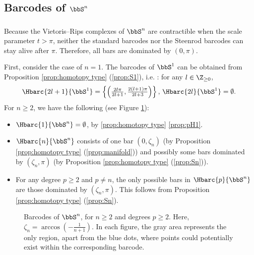 \subsection{Barcodes of $\bbS^n$}\label{ss:Sn}

\subsubsection{}

Because the Vietoris--Rips complexes of $\bbS^n$ are contractible when the scale parameter $t>\pi$, neither the standard barcodes nor the Steenrod barcodes can stay alive after $\pi$.
Therefore, all bars are dominated by $(0,\pi)$.

First, consider the case of $n=1$.
The barcodes of $\bbS^1$ can be obtained from Proposition \ref{prop:homotopy type} (\ref{prop:S1}), i.e. \cite[Theorem 7.4]{adamaszek2017vietoris}: for any $l\in \Z_{\geq 0}$,
\begin{equation}\label{eq:barc of S1}
	\Hbarc{2l+1}{\bbS^1}=\left\{\left(\tfrac{2l\pi}{2l+1},\tfrac{2(l+1)\pi}{2l+3}\right)\right\},\, \Hbarc{2l}{\bbS^1}=\emptyset.
\end{equation}
For $n\geq 2$, we have the following (see Figure \ref{fig:Sk}):
\begin{itemize}
	\item $\Hbarc{1}{\bbS^n} = \emptyset$, by \cref{prop:homotopy type} \cref{prop:pH1}.
	\item $\Hbarc{n}{\bbS^n}$ consists of one bar $(0,\zeta_n)$ (by Proposition \ref{prop:homotopy type} (\ref{prop:manifold})) and possibly some bars dominated by $(\zeta_n,\pi)$ (by Proposition \ref{prop:homotopy type} (\ref{prop:Sn})).
	\item For any degree $p\geq 2$ and $p\neq n$, the only possible bars in $\Hbarc{p}{\bbS^n}$ are those  dominated by  $(\zeta_n,\pi)$.
	This follows from  Proposition \ref{prop:homotopy type} (\ref{prop:Sn}).
\end{itemize}

\begin{figure}[ht]
	\centering
	
	\caption{
		Barcodes of $\bbS^n$, for $n\geq 2$ and degrees $p\geq 2$.
		Here, $\zeta_n=\arccos(-\frac{1}{n+1})$.
		In each figure, the gray area represents the only region, apart from the blue dots, where points could potentially exist within the corresponding barcode.}
	\label{fig:Sk}
\end{figure}

